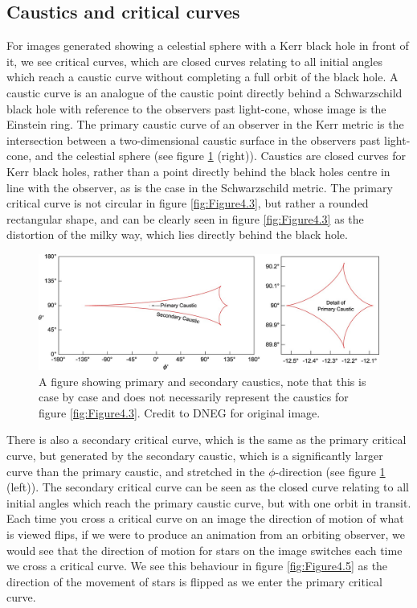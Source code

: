 \documentclass[oneside,openright,frontopenright, singlespacing]{dmathesis}
\begin{document}
\subsection{Caustics and critical curves}\label{subsec:Subsection4.8.2}

\vspace{1em}
	For images generated showing a celestial sphere with a Kerr black hole in front of it, we see critical curves, which are closed curves relating to all initial angles which reach a caustic curve without completing a full orbit of the black hole. A caustic curve is an analogue of the caustic point directly behind a Schwarzschild black hole with reference to the observers past light-cone, whose image is the Einstein ring. The primary caustic curve of an observer in the Kerr metric is the intersection between a two-dimensional caustic surface in the observers past light-cone, and the celestial sphere (see figure \ref{fig:Figure4.4} (right)). Caustics are closed curves for Kerr black holes, rather than a point directly behind the black holes centre in line with the observer, as is the case in the Schwarzschild metric. The primary critical curve is not circular in figure \ref{fig:Figure4.3}, but rather a rounded rectangular shape, and can be clearly seen in figure \ref{fig:Figure4.3} as the distortion of the milky way, which lies directly behind the black hole.

\begin{figure}[!ht]
	\centering
	\includegraphics[width=0.87\linewidth]{img/caustic0}
	\caption{A figure showing primary and secondary caustics, note that this is case by case and does not necessarily represent the caustics for figure \ref{fig:Figure4.3}. Credit to DNEG for original image\cite{thorne2015gravitational}.}
	\label{fig:Figure4.4}
\end{figure}

	There is also a secondary critical curve, which is the same as the primary critical curve, but generated by the secondary caustic, which is a significantly larger curve than the primary caustic, and stretched in the $\phi$-direction (see figure \ref{fig:Figure4.4} (left)). The secondary critical curve can be seen as the closed curve relating to all initial angles which reach the primary caustic curve, but with one orbit in transit. Each time you cross a critical curve on an image the direction of motion of what is viewed flips, if we were to produce an animation from an orbiting observer, we would see that the direction of motion for stars on the image switches each time we cross a critical curve. We see this behaviour in figure \ref{fig:Figure4.5} as the direction of the movement of stars is flipped as we enter the primary critical curve.
\end{document}
